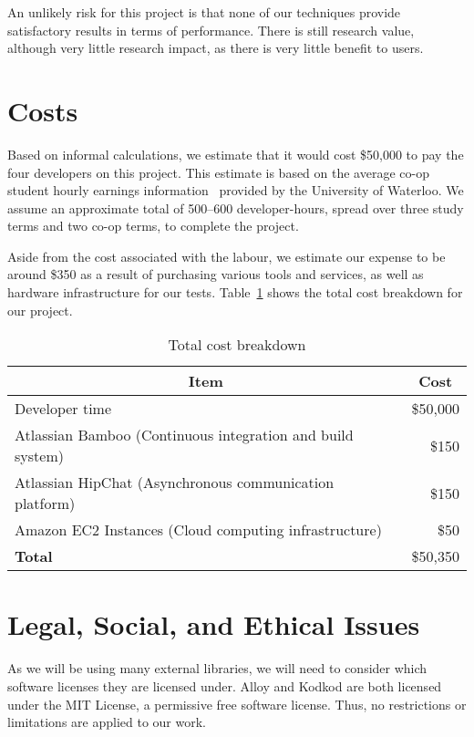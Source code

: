 \documentclass[11pt]{article}
\begin{document}
An unlikely risk for this project is that none of our techniques
provide satisfactory results in terms of performance. There is still
research value, although very little research impact, as there is very
little benefit to users.

\section{Costs}\label{sec:costs}
Based on informal calculations, we estimate that it would cost \$50,000
to pay the four developers on this project. This estimate is based on
the average co-op student hourly earnings information~\cite{ref:ceca}
provided by the University of Waterloo. We assume an approximate total
of 500--600 developer-hours, spread over three study terms and two
co-op terms, to complete the project.

Aside from the cost associated with the labour, we estimate our expense
to be around \$350 as a result of purchasing various tools and
services, as well as hardware infrastructure for our tests.
Table~\ref{tbl:costbreakdown} shows the total cost breakdown for our
project.

\begin{table}[H]
  \captionsetup{margin=30pt}
  \caption{Total cost breakdown}\label{tbl:costbreakdown}
  \centering
  \begin{tabular}{lr}
    \hline
    \multicolumn{1}{c}{\textbf{Item}} &
    \multicolumn{1}{c}{\textbf{Cost}} \\
    \hline
      Developer time & \$50,000 \\
      Atlassian Bamboo (Continuous integration and build system) \cite{ref:bamboo} & \$150 \\
      Atlassian HipChat (Asynchronous communication platform) \cite{ref:hipchat} & \$150 \\
      Amazon EC2 Instances (Cloud computing infrastructure) \cite{ref:ec2} & \$50 \\
    \hline
    \textbf{Total} & \$50,350 \\
    \hline
  \end{tabular}
\end{table}

\section{Legal, Social, and Ethical Issues}\label{sec:issues}
As we will be using many external libraries, we will need to consider
which software licenses they are licensed under. Alloy and Kodkod are
both licensed under the MIT License, a permissive free software
license. Thus, no restrictions or limitations are applied to our work.
\end{document}
